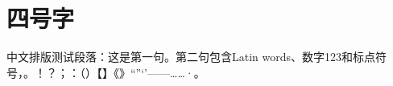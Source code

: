 \documentclass[a4paper,UTF8,scheme=chinese,zihao=-4]{ctexart}
\begin{document}
\section{四号字}
中文排版测试段落：这是第一句。第二句包含Latin words、数字123和标点符号，。！？；：（）【】《》“”‘’——……·。
\end{document}
